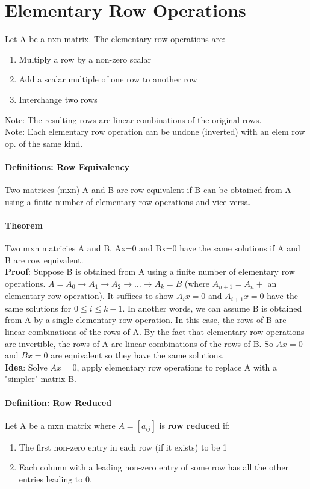 \documentclass[10pt,letter]{article}
\begin{document}
\section*{Elementary Row Operations}
Let A be a nxn matrix. The elementary row operations are:
\begin{enumerate}
    \item Multiply a row by a non-zero scalar
    \item Add a scalar multiple of one row to another row 
    \item Interchange two rows 
\end{enumerate}
Note: The resulting rows are linear combinations of the original rows. \\ 
Note: Each elementary row operation can be undone (inverted) with an elem row op. of the same kind. 

\paragraph*{Definitions: Row Equivalency}
Two matrices (mxn) A and B are row equivalent if B can be obtained from A using a finite number of elementary row operations and vice versa. 

\paragraph*{Theorem}
Two mxn matricies A and B, Ax=0 and Bx=0 have the same solutions if A and B are row equivalent. \\ 
\textbf{Proof}: Suppose B is obtained from A using a finite number of elementary row operations. $A=A_0\rightarrow A_1\rightarrow A_2\rightarrow\ldots\rightarrow A_k = B$ (where $A_{n+1}=A_n +$ an elementary row operation). It suffices to show $A_ix=0$ and $A_{i+1}x=0$ have the same solutions for $0\leq i\leq k-1$. In another words, we can assume B is obtained from A by a single elementary row operation. In this case, the rows of B are linear combinations of the rows of A. By the fact that elementary row operations are invertible, the rows of A are linear combinations of the rows of B. So $Ax=0$ and $Bx=0$ are equivalent so they have the same solutions. \\ 
\textbf{Idea}: Solve $Ax=0$, apply elementary row operations to replace A with a "simpler" matrix B. 

\paragraph*{Definition: Row Reduced}
Let A be a mxn matrix where $A=[a_{ij}]$ is \textbf{row reduced} if:
\begin{enumerate}
    \item The first non-zero entry in each row (if it exists) to be 1
    \item Each column with a leading non-zero entry of some row has all the other entries leading to 0. 
\end{enumerate}
\end{document}
